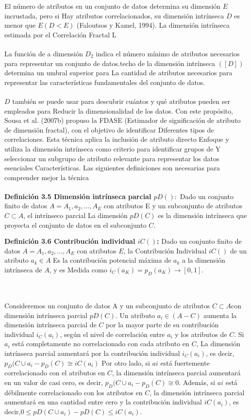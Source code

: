 El número de atributos en un conjunto de datos determina su dimensión $E$ incrustada, pero si
Hay atributos correlacionados, su dimensión intrínseca $D$ es menor que $E (D < E)$
(Faloutsos y Kamel, 1994). La dimensión intrínseca estimada por el Correlación Fractal
L
\\\\
La función de a dimensión $D_2$ indica el número mínimo de atributos necesarios para representar un conjunto de datos.techo de la dimensión intrínseca $([D])$ determina un umbral superior para
La cantidad de atributos necesarios para representar las características fundamentales del conjunto de datos.
\\\\
$D$ también se puede usar para descubrir cuántos y qué atributos pueden ser empleados para
Reducir la dimensionalidad de los datos. Con este propósito, Sousa et al. (2007b) propuso la FDASE
(Estimador de significación de atributo de dimensión fractal), con el objetivo de identificar
Diferentes tipos de correlaciones. Esta técnica aplica la inclusión de atributo directo
Enfoque y utiliza la dimensión intrínseca como criterio para identificar grupos de
Y seleccionar un subgrupo de atributo relevante para representar los datos esenciales
Características. Las siguientes definiciones son necesarias para comprender mejor la técnica
\\\\

\textbf{Definición 3.5 Dimensión intrínseca parcial $pD():$} Dado un conjunto finito de datos $A = {A_1, a_2,. . . , A_E}$ con atributos E y un subconjunto de atributos $C \subset A$, el intrínseco parcial
La dimensión $pD (C)$ es la dimensión intrínseca que proyecta el conjunto de datos en el subconjunto $C$.


\textbf{Definición 3.6 Contribución individual $iC()$: }Dado un conjunto finito de datos $A = {A_1, a_2,. . . , A_E}$ con atributos $E$, la Contribución Individual $iC()$ de un atributo $a_k \in A $
Es la contribución potencial máxima de $a_k$ a la dimensión intrínseca de $A$, y es
Medida como $ i_C(a_K) = p_D({a_K})\rightarrow [0,1]$.

\\\\
Consideremos un conjunto de datos A y un subconjunto de atributos  $C \subset A$con dimensión intrínseca parcial
$pD (C)$. Un atributo $a_i \in (A - C)$ aumenta la dimensión intrínseca parcial de $ C$ por la mayor parte de su contribución individual $i_C (a_i)$, según el nivel de correlación entre $a_i$ y los atributos de $C$. Si $a_i$ está completamente no correlacionado con cada atributo en $C$,
La dimensión intrínseca parcial aumentará por la contribución individual  $i_C (a_i)$, es decir, $p_D(C \cup{a_i} - p_D(C)\cong iC (a_i)$ Por otro lado, si $ai$ está fuertemente correlacionado con el atributos en $C$, la dimensión intrínseca parcial aumentará en un valor de casi cero, es decir, $p_D(C \cup{a_i} - p_D(C)\cong 0$. Además, si $ai$ está débilmente correlacionado con los atributos en $C$, la dimensión intrínseca parcial aumentará en una cantidad entre cero y la contribución individual $iC (a_i)$, es decir,$0\leq pD(C\cup{a_i}) -pD(C) \leq iC(a_i)$.

